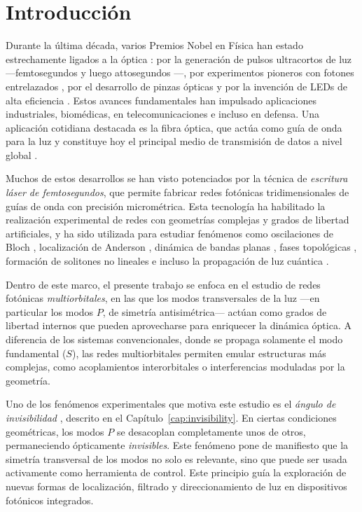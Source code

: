 \chapter{Introducción}

Durante la última década, varios Premios Nobel en Física han estado estrechamente ligados a la óptica \cite{nobel}: por la generación de pulsos ultracortos de luz —femtosegundos \cite{femto1} y luego attosegundos \cite{atto1, atto2, atto3}—, por experimentos pioneros con fotones entrelazados \cite{photons1, photons2, photons3}, por el desarrollo de pinzas ópticas \cite{opticaltweezers} y por la invención de LEDs de alta eficiencia \cite{led1, led2, led3}. Estos avances fundamentales han impulsado aplicaciones industriales, biomédicas, en telecomunicaciones e incluso en defensa. Una aplicación cotidiana destacada es la fibra óptica, que actúa como guía de onda para la luz y constituye hoy el principal medio de transmisión de datos a nivel global \cite{fibra2, fibra}.

Muchos de estos desarrollos se han visto potenciados por la técnica de \textit{escritura láser de femtosegundos}, que permite fabricar redes fotónicas tridimensionales de guías de onda con precisión micrométrica. Esta tecnología ha habilitado la realización experimental de redes con geometrías complejas y grados de libertad artificiales, y ha sido utilizada para estudiar fenómenos como oscilaciones de Bloch \cite{BlochOsci}, localización de Anderson \cite{Anderson}, dinámica de bandas planas \cite{lieb1, lieb2, artificialFB, FBdynamics}, fases topológicas \cite{obstopo, obsfloquet, topo1dphoto, toporusos}, formación de solitones no lineales \cite{discretesolitons} e incluso la propagación de luz cuántica \cite{qed, squeezed, topoquantum}.

Dentro de este marco, el presente trabajo se enfoca en el estudio de redes fotónicas \textit{multiorbitales}, en las que los modos transversales de la luz —en particular los modos \( P \), de simetría antisimétrica— actúan como grados de libertad internos que pueden aprovecharse para enriquecer la dinámica óptica. A diferencia de los sistemas convencionales, donde se propaga solamente el modo fundamental (\( S \)), las redes multiorbitales permiten emular estructuras más complejas, como acoplamientos interorbitales o interferencias moduladas por la geometría.

Uno de los fenómenos experimentales que motiva este estudio es el \textit{ángulo de invisibilidad} \cite{Pmodecoupling}, descrito en el Capítulo~\ref{cap:invisibility}. En ciertas condiciones geométricas, los modos \( P \) se desacoplan completamente unos de otros, permaneciendo ópticamente \textit{invisibles}. Este fenómeno pone de manifiesto que la simetría transversal de los modos no solo es relevante, sino que puede ser usada activamente como herramienta de control. Este principio guía la exploración de nuevas formas de localización, filtrado y direccionamiento de luz en dispositivos fotónicos integrados.

